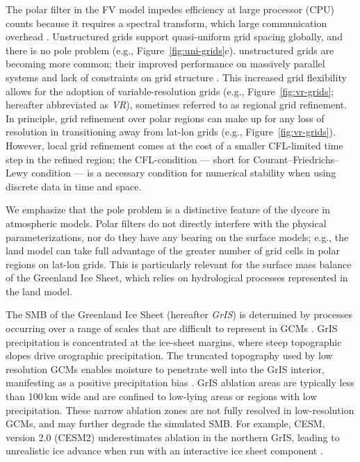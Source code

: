 \documentclass[draft]{agujournal2019}
\begin{document}
The polar filter in the FV model impedes efficiency at large processor (CPU) counts because it requires a spectral transform, which {\color{blue}{has a}} large communication overhead \cite{ST1995GEOS,DetAl2012IJHPCA}. Unstructured grids support quasi-uniform grid spacing globally, and there is no pole problem (e.g., Figure~\ref{fig:uni-grids}c). {\color{blue}{This is in part why}} unstructured grids are becoming more common; their improved performance on massively parallel systems and lack of constraints on grid structure \cite{TTI1997JCP,PL2007JCP,WETAL2013GMD}. This increased grid flexibility allows for the adoption of variable-resolution grids (e.g., Figure~\ref{fig:vr-grids}; hereafter abbreviated as \textit{VR}), sometimes referred to as regional grid refinement. In principle, grid refinement over polar regions can make up for any loss of resolution in transitioning away from lat-lon grids (e.g., Figure~\ref{fig:vr-grids}).  However, local grid refinement comes at the cost of a smaller CFL-limited time step in the refined region; the CFL-condition --- short for Courant–Friedrichs–Lewy condition --- is a necessary condition for numerical stability when using discrete data in time and space.

We emphasize that the pole problem is a distinctive feature of the dycore in atmospheric models. Polar filters do not directly interfere with the physical parameterizations, nor do they have any bearing on the surface models; e.g., the land model can take full advantage of the greater number of grid cells in polar regions on lat-lon grids. This is particularly relevant for the surface mass balance {} of the Greenland Ice Sheet, which relies on hydrological processes represented in the land model.

The SMB of the Greenland Ice Sheet (hereafter \textit{GrIS}) is determined by processes occurring over a range of scales that are difficult to represent in GCMs \cite{P2010CC}. GrIS precipitation is concentrated at the ice-sheet margins, where steep topographic slopes drive orographic precipitation. The truncated topography used by low resolution GCMs enables moisture to penetrate well into the GrIS interior, manifesting as a positive precipitation bias {\color{blue}{in the interior}} \cite{P2000GPC,VETAL2018TC}. GrIS ablation areas {\color{blue}{(marginal regions where the annual SMB is negative)}} are typically less than 100\,km wide and are confined to low-lying areas or regions with low precipitation. These narrow ablation zones are not fully resolved in low-resolution GCMs, and may further degrade the simulated SMB. {} For example, CESM, version 2.0 (CESM2) underestimates ablation in the northern GrIS, leading to unrealistic ice advance when run with an interactive ice sheet component \cite{LETAL2020JAMES}.
\end{document}
